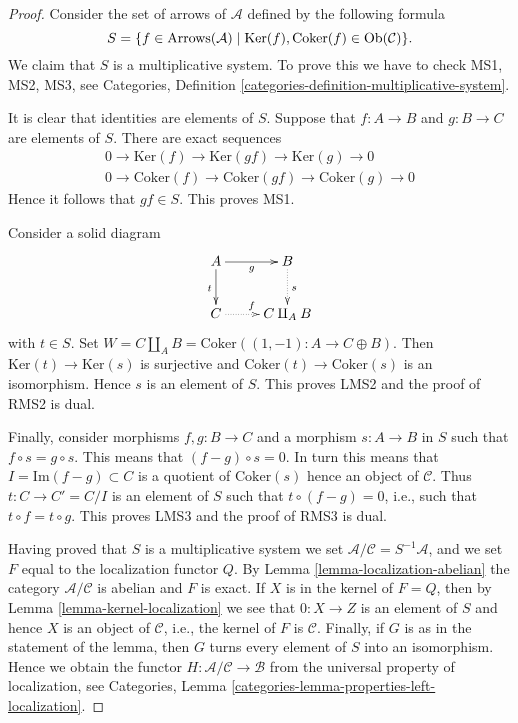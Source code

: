 \begin{proof}
Consider the set of arrows of $\mathcal{A}$ defined by
the following formula
$$
S = \{f \in \text{Arrows}(\mathcal{A}) \mid
\text{Ker}(f), \text{Coker}(f) \in \mathop{\rm Ob}\nolimits(\mathcal{C}) \}.
$$
We claim that $S$ is a multiplicative system. To prove this we have
to check MS1, MS2, MS3, see
Categories, Definition \ref{categories-definition-multiplicative-system}.

\medskip\noindent
It is clear that identities are elements of $S$. Suppose that
$f : A \to B$ and $g : B \to C$ are elements of $S$.
There are exact sequences
$$
\begin{matrix}
0 \to \text{Ker}(f) \to \text{Ker}(gf) \to \text{Ker}(g) \to 0 \\
0 \to \text{Coker}(f) \to \text{Coker}(gf) \to \text{Coker}(g) \to 0
\end{matrix}
$$
Hence it follows that $gf \in S$. This proves MS1.

\medskip\noindent
Consider a solid diagram
$$
\xymatrix{
A \ar[d]_t \ar[r]_g & B \ar@{..>}[d]^s \\
C \ar@{..>}[r]^f & C \amalg_A B
}
$$
with $t \in S$. Set
$W = C \amalg_A B =  \text{Coker}((1, -1) : A \to C \oplus B)$.
Then $\text{Ker}(t) \to \text{Ker}(s)$ is surjective and
$\text{Coker}(t) \to \text{Coker}(s)$ is an isomorphism. Hence
$s$ is an element of $S$. This proves LMS2 and the proof of RMS2 is dual.

\medskip\noindent
Finally, consider morphisms $f, g : B \to C$ and a morphism $s : A \to B$
in $S$ such that $f \circ s = g \circ s$. This means that
$(f - g) \circ s = 0$. In turn this means that
$I = \text{Im}(f - g) \subset C$ is a quotient of $\text{Coker}(s)$
hence an object of $\mathcal{C}$. Thus $t : C \to C' = C/I$ is an
element of $S$ such that $t \circ (f - g) = 0$, i.e., such that
$t \circ f = t \circ g$. This proves LMS3 and the proof of
RMS3 is dual.

\medskip\noindent
Having proved that $S$ is a multiplicative system we set
$\mathcal{A}/\mathcal{C} = S^{-1}\mathcal{A}$, and we set
$F$ equal to the localization functor $Q$. By
Lemma \ref{lemma-localization-abelian}
the category $\mathcal{A}/\mathcal{C}$ is abelian and $F$ is exact.
If $X$ is in the kernel of $F = Q$, then by
Lemma \ref{lemma-kernel-localization}
we see that $0 : X \to Z$ is an element of $S$ and hence
$X$ is an object of $\mathcal{C}$, i.e., the kernel of
$F$ is $\mathcal{C}$.
Finally, if $G$ is as in the statement of the lemma, then $G$ turns
every element of $S$ into an isomorphism. Hence we obtain the
functor $H : \mathcal{A}/\mathcal{C} \to \mathcal{B}$ from
the universal property of localization, see
Categories, Lemma \ref{categories-lemma-properties-left-localization}.
\end{proof}

